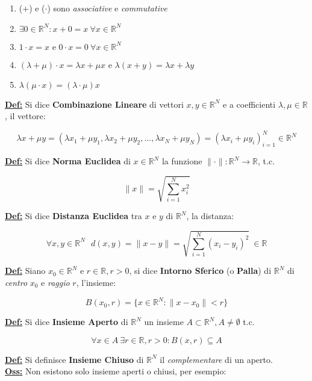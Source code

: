 \documentclass[a4paper,12pt]{article}
\newcommand{\definizione}{\noindent\textbf{\underline{Def:}} }
\begin{document}
	\begin{enumerate}
		\item (+) e ($\cdot$) sono \textit{associative} e \textit{commutative}
		\item $\exists 0 \in \mathbb{R}^N : x + 0 = x \ \forall x \in \mathbb{R}^N$
		\item $1 \cdot x = x \text{ e } 0 \cdot x = 0 \ \forall x \in \mathbb{R}^N$
		\item $ (\lambda + \mu) \cdot x = \lambda x + \mu x \text{ e } \lambda(x + y) = \lambda x + \lambda y$
		\item $\lambda (\mu \cdot x ) = (\lambda \cdot \mu) x$
	\end{enumerate}

	\definizione Si dice \textbf{Combinazione Lineare} di vettori $x,y \in \mathbb{R}^N$ e a coefficienti $\lambda, \mu \in \mathbb{R}$, il vettore:

	\[
	\lambda x + \mu y = (\lambda x_1 + \mu y_1, \lambda x_2 + \mu y_2, ..., \lambda x_N + \mu y_N) = (\lambda x_i + \mu y_i)_{i = 1}^N \in \mathbb{R}^N
	\]

	\definizione Si dice \textbf{Norma Euclidea} di $x \in \mathbb{R}^N$ la funzione $\| \cdot \| : \mathbb{R}^N \rightarrow \mathbb{R}$, t.c.

	\[
	\|x\| = \sqrt{\sum_{i=1}^{N} x_i^2}
	\]

	\definizione Si dice \textbf{Distanza Euclidea} tra $x$ e $y$ di $\mathbb{R}^N$, la distanza:

	\[
	\forall x,y \in \mathbb{R}^N \ \ \ d(x,y) = \|x - y \| = \sqrt{\sum_{i=1}^{N} (x_i - y_i)^2} \ \in \mathbb{R}
	\]

	\definizione Siano $x_0 \in \mathbb{R}^N$ e $r \in \mathbb{R}, r > 0$, si dice \textbf{Intorno Sferico} (o \textbf{Palla}) di $\mathbb{R}^N$ di \textit{centro} $x_0$ e \textit{raggio} $r$, l'insieme:

	\[
	B(x_0, r) = \{x \in \mathbb{R}^N : \| x - x_0 \| < r \}
	\]

	\definizione Si dice \textbf{Insieme Aperto} di $\mathbb{R}^N$ un insieme $A \subset \mathbb{R}^N, A \neq \emptyset$ t.c.

	\[
	\forall x \in A \ \exists r \in \mathbb{R}, r > 0 : B (x,r) \subseteq A
	\]

	\definizione Si definisce \textbf{Insieme Chiuso} di $\mathbb{R}^N$ il \textit{complementare} di un aperto. \\

	\noindent\textbf{\underline{Oss:} } Non esistono solo insieme aperti o chiusi, per esempio:
\end{document}
